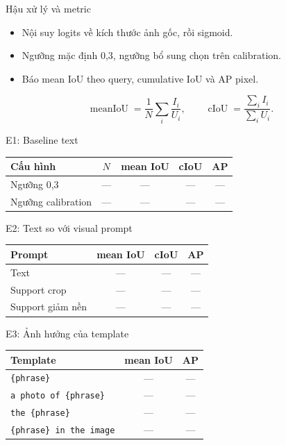 \begin{frame}{Hậu xử lý và metric}
\begin{itemize}
\item Nội suy logits về kích thước ảnh gốc, rồi sigmoid.
\item Ngưỡng mặc định 0,3, ngưỡng bổ sung chọn trên calibration.
\item Báo mean IoU theo query, cumulative IoU và AP pixel.
\end{itemize}
\[
\operatorname{meanIoU}=\frac{1}{N}\sum_i\frac{I_i}{U_i},\qquad
\operatorname{cIoU}=\frac{\sum_i I_i}{\sum_i U_i}.
\]
\end{frame}

\begin{frame}{E1: Baseline text}
\begin{table}
\centering
\begin{tabular}{@{}lcccc@{}}
\toprule
Cấu hình & $N$ & mean IoU & cIoU & AP \\
\midrule
Ngưỡng 0,3 & --- & --- & --- & --- \\
Ngưỡng calibration & --- & --- & --- & --- \\
\bottomrule
\end{tabular}
\end{table}
\end{frame}

\begin{frame}{E2: Text so với visual prompt}
\begin{table}
\centering
\begin{tabular}{@{}lccc@{}}
\toprule
Prompt & mean IoU & cIoU & AP \\
\midrule
Text & --- & --- & --- \\
Support crop & --- & --- & --- \\
Support giảm nền & --- & --- & --- \\
\bottomrule
\end{tabular}
\end{table}
\end{frame}

\begin{frame}{E3: Ảnh hưởng của template}
\begin{table}
\centering
\begin{tabular}{@{}lcc@{}}
\toprule
Template & mean IoU & AP \\
\midrule
\texttt{\{phrase\}} & --- & --- \\
\texttt{a photo of \{phrase\}} & --- & --- \\
\texttt{the \{phrase\}} & --- & --- \\
\texttt{\{phrase\} in the image} & --- & --- \\
\bottomrule
\end{tabular}
\end{table}
\end{frame}

